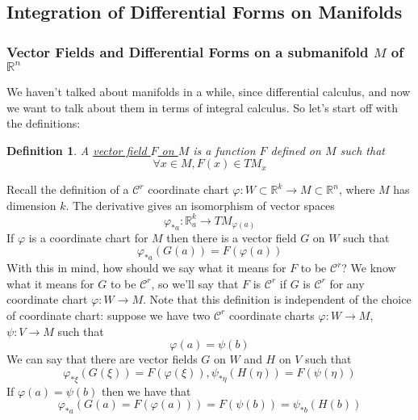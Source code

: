 \documentclass{article}
\newtheorem{definition}{Definition}
\newcommand{\reals}[0]{\mathbb{R}}
\newcommand{\mc}[1]{\mathcal{#1}}
\begin{document}
\subsection{Integration of Differential Forms on Manifolds}

\subsubsection{Vector Fields and Differential Forms on a submanifold \(M\) of \(\reals^n\)}

We haven't talked about manifolds in a while, since differential calculus, and now we want to talk about them in terms of integral calculus. So let's start off with the definitions:
\begin{definition}
  A \underline{vector field \(F\) on \(M\)} is a function \(F\) defined on \(M\) such that
  \begin{equation}
    \forall x \in M, F(x) \in TM_x
  \end{equation}
\end{definition}
Recall the definition of a \(\mc{C}^r\) coordinate chart \(\varphi: W \subset \reals^k \to M \subset \reals^n\), where \(M\) has dimension \(k\). The derivative gives an isomorphism of vector spaces
\begin{equation}
  \varphi_{*a} : \reals_a^k \to TM_{\varphi(a)}
\end{equation}
If \(\varphi\) is a coordinate chart for \(M\) then there is a vector field \(G\) on \(W\) such that
\begin{equation}
  \varphi_{*a}(G(a)) = F(\varphi(a))
\end{equation}
With this in mind, how should we say what it means for \(F\) to be \(\mc{C}^r\)? We know what it means for \(G\) to be \(\mc{C}^r\), so we'll say that \(F\) is \(\mc{C}^r\) if \(G\) is \(\mc{C}^r\) for any coordinate chart \(\varphi: W \to M\). Note that this definition is independent of the choice of coordinate chart: suppose we have two \(\mc{C}^r\) coordinate charts \(\varphi: W \to M\), \(\psi : V \to M\) such that
\begin{equation}
  \varphi(a) = \psi(b)
\end{equation}
We can say that there are vector fields \(G\) on \(W\) and \(H\) on \(V\) such that
\begin{equation}
  \varphi_{*\xi}(G(\xi)) = F(\varphi(\xi)), \psi_{*\eta}(H(\eta)) = F(\psi(\eta))
\end{equation}
If \(\varphi(a) = \psi(b)\) then we have that
\begin{equation}
  \varphi_{*a}(G(a) = F(\varphi(a))) = F(\psi(b)) = \psi_{*b}(H(b))
\end{equation}
\end{document}
